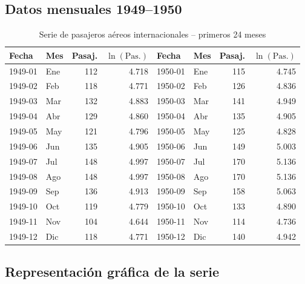 \documentclass[12pt, a4paper]{article}
\begin{document}
\subsection{Datos mensuales 1949--1950}

\begin{table}[H]
  \centering
  \caption{Serie de pasajeros aéreos internacionales -- primeros 24 meses}
  \label{tab:pasajeros}
  \begin{tabular}{llrr|llrr}
    \toprule
    \textbf{Fecha} & \textbf{Mes} & \textbf{Pasaj.} & $\ln(\text{Pas.})$
    & \textbf{Fecha} & \textbf{Mes} & \textbf{Pasaj.} & $\ln(\text{Pas.})$ \\
    \midrule
    1949-01 & Ene & 112 & 4.718 & 1950-01 & Ene & 115 & 4.745 \\
    1949-02 & Feb & 118 & 4.771 & 1950-02 & Feb & 126 & 4.836 \\
    1949-03 & Mar & 132 & 4.883 & 1950-03 & Mar & 141 & 4.949 \\
    1949-04 & Abr & 129 & 4.860 & 1950-04 & Abr & 135 & 4.905 \\
    1949-05 & May & 121 & 4.796 & 1950-05 & May & 125 & 4.828 \\
    1949-06 & Jun & 135 & 4.905 & 1950-06 & Jun & 149 & 5.003 \\
    1949-07 & Jul & 148 & 4.997 & 1950-07 & Jul & 170 & 5.136 \\
    1949-08 & Ago & 148 & 4.997 & 1950-08 & Ago & 170 & 5.136 \\
    1949-09 & Sep & 136 & 4.913 & 1950-09 & Sep & 158 & 5.063 \\
    1949-10 & Oct & 119 & 4.779 & 1950-10 & Oct & 133 & 4.890 \\
    1949-11 & Nov & 104 & 4.644 & 1950-11 & Nov & 114 & 4.736 \\
    1949-12 & Dic & 118 & 4.771 & 1950-12 & Dic & 140 & 4.942 \\
    \bottomrule
  \end{tabular}
\end{table}

\subsection{Representación gráfica de la serie}

%
\end{document}
